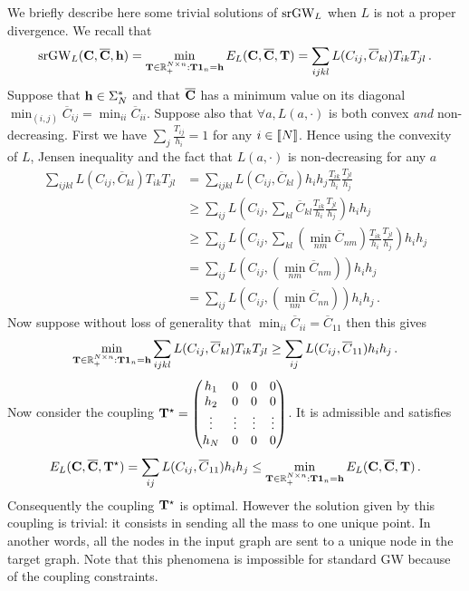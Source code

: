 We briefly describe here some trivial solutions of $\operatorname{srGW}_L$ when $L$ is not a proper divergence. We recall that
\begin{equation}
	\operatorname{srGW}_L({\mathbf{C}}, \overline{{\mathbf{C}}}, {\mathbf{h}}) = \min_{{\mathbf{T}} \in \mathbb{R}_+^{N \times n}: {\mathbf{T}} \bm{1}_n = {\mathbf{h}}} E_{L}({\mathbf{C}}, \overline{{\mathbf{C}}}, {\mathbf{T}}) = \sum_{ijkl} L(C_{ij}, \overline{C}_{kl}) T_{ik} T_{jl}\,.
\end{equation}
Suppose that ${\mathbf{h}} \in \Sigma_N^{*}$ and that $\overline{{\mathbf{C}}}$ has a minimum value on its diagonal \ie\ $\min_{(i,j)} \overline{C}_{ij} = \min_{ii} \overline{C}_{ii}$. Suppose also that $\forall a, L(a, \cdot)$ is both convex \emph{and} non-decreasing. First we have $\sum_{j} \frac{T_{ij}}{h_i} = 1$ for any $i \in {[\![N]\!]}$. Hence using the convexity of $L$, Jensen inequality and the fact that $L(a, \cdot)$ is non-decreasing for any $a$ 
\begin{equation}
	\begin{split}
		\sum_{ijkl} L(C_{ij}, \overline{C}_{kl}) T_{ik} T_{jl} &= \sum_{ijkl} L(C_{ij}, \overline{C}_{kl}) h_i h_j \frac{T_{ik}}{h_i} \frac{T_{jl}}{h_j} \\
		&\geq \sum_{ij} L(C_{ij}, \sum_{kl} \overline{C}_{kl}\frac{T_{ik}}{h_i} \frac{T_{jl}}{h_j}) h_i h_j \\
		&\geq \sum_{ij} L(C_{ij}, \sum_{kl} (\min_{nm} \overline{C}_{nm})\frac{T_{ik}}{h_i} \frac{T_{jl}}{h_j}) h_i h_j\\
		&= \sum_{ij} L(C_{ij}, (\min_{nm} \overline{C}_{nm})) h_i h_j \\
		&= \sum_{ij} L(C_{ij}, (\min_{nn} \overline{C}_{nn})) h_i h_j\,.
	\end{split}
\end{equation} 
Now suppose without loss of generality that $\min_{ii} \overline{C}_{ii} = \overline{C}_{11}$ then this gives
\begin{equation}
	\min_{{\mathbf{T}} \in \mathbb{R}_+^{N \times n}: {\mathbf{T}} \bm{1}_n = {\mathbf{h}}} \sum_{ijkl} L(C_{ij}, \overline{C}_{kl}) T_{ik} T_{jl} \geq \sum_{ij} L(C_{ij},  \overline{C}_{11}) h_i h_j\,.
\end{equation}
Now consider the coupling
${\mathbf{T}}^\star = 
\begin{pmatrix}
	h_1 & 0 & 0 & 0 \\
	h_2 & 0 & 0 & 0 \\
	\vdots & \vdots & \vdots & \vdots \\
	h_N & 0 & 0 & 0 \\
\end{pmatrix}$. It is admissible and satisfies
\begin{equation}
	E_{L}({\mathbf{C}}, \overline{{\mathbf{C}}}, {\mathbf{T}}^\star) = \sum_{ij} L(C_{ij},  \overline{C}_{11}) h_i h_j \leq \min_{{\mathbf{T}} \in \mathbb{R}_+^{N \times n}: {\mathbf{T}} \bm{1}_n = {\mathbf{h}}} E_{L}({\mathbf{C}}, \overline{{\mathbf{C}}}, {\mathbf{T}})\,.
\end{equation}
Consequently the coupling ${\mathbf{T}}^\star$ is optimal. However the solution given by this coupling is trivial: it consists in sending all the mass to one unique point. In another words, all the nodes in the input graph are sent to a unique node in the target graph. Note that this phenomena is impossible for standard GW because of the coupling constraints. 


